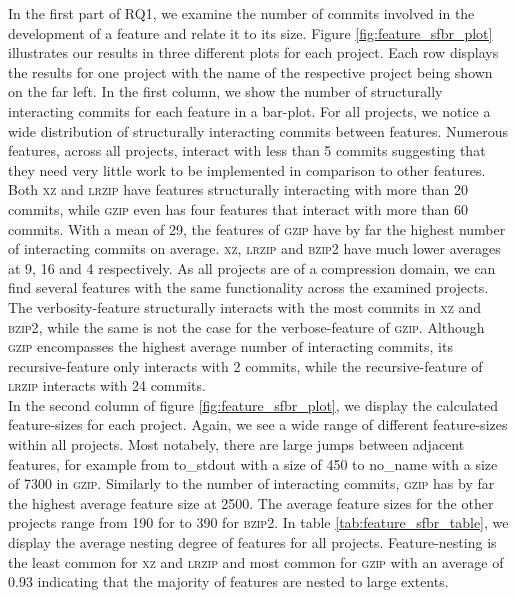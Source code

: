 In the first part of RQ1, we examine the number of commits involved in the development of a feature and relate it to its size.
Figure \ref{fig:feature_sfbr_plot} illustrates our results in three different plots for each project.
Each row displays the results for one project with the name of the respective project being shown on the far left. 
In the first column, we show the number of structurally interacting commits for each feature in a bar-plot.
For all projects, we notice a wide distribution of structurally interacting commits between features.
Numerous features, across all projects, interact with less than 5 commits suggesting that they need very little work to be implemented in comparison to other features.
Both \textsc{xz} and \textsc{lrzip} have features structurally interacting with more than 20 commits, while \textsc{gzip} even has four features that interact with more than 60 commits.
With a mean of 29, the features of \textsc{gzip} have by far the highest number of interacting commits on average.
\textsc{xz}, \textsc{lrzip} and \textsc{bzip2} have much lower averages at 9, 16 and 4 respectively.
As all projects are of a compression domain, we can find several features with the same functionality across the examined projects.
The \textsf{verbosity}-feature structurally interacts with the most commits in \textsc{xz} and \textsc{bzip2}, while the same is not the case for the \textsf{verbose}-feature of \textsc{gzip}.
Although \textsc{gzip} encompasses the highest average number of interacting commits, its \textsf{recursive}-feature only interacts with 2 commits, while the \textsf{recursive}-feature of \textsc{lrzip} interacts with 24 commits. \\
In the second column of figure \ref{fig:feature_sfbr_plot}, we display the calculated feature-sizes for each project.
Again, we see a wide range of different feature-sizes within all projects.
Most notabely, there are large jumps between adjacent features, for example from \textsf{to\_stdout} with a size of 450 to \textsf{no\_name} with a size of 7300 in \textsc{gzip}.
Similarly to the number of interacting commits, \textsc{gzip} has by far the highest average feature size at 2500.
The average feature sizes for the other projects range from 190 for  to 390 for \textsc{bzip2}. 
In table \ref{tab:feature_sfbr_table}, we display the average nesting degree of features for all projects.
Feature-nesting is the least common for \textsc{xz} and \textsc{lrzip} and most common for \textsc{gzip} with an average of 0.93 indicating that the majority of features are nested to large extents.
